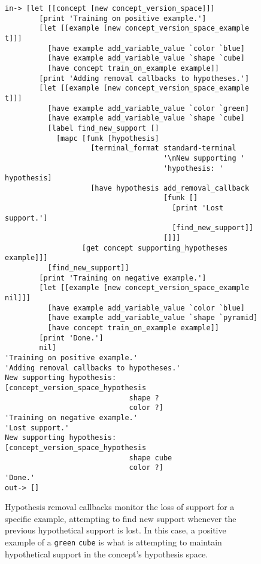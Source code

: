 \begin{figure}[h]
\centering
{\small
\begin{Verbatim}[frame=single]
 in-> [let [[concept [new concept_version_space]]]
        [print 'Training on positive example.']
        [let [[example [new concept_version_space_example t]]]
          [have example add_variable_value `color `blue]
          [have example add_variable_value `shape `cube]
          [have concept train_on_example example]]
        [print 'Adding removal callbacks to hypotheses.']
        [let [[example [new concept_version_space_example t]]]
          [have example add_variable_value `color `green]
          [have example add_variable_value `shape `cube]
          [label find_new_support []
            [mapc [funk [hypothesis]
                    [terminal_format standard-terminal
                                     '\nNew supporting '
                                     'hypothesis: ' hypothesis]
                    [have hypothesis add_removal_callback
                                     [funk []
                                       [print 'Lost support.']
                                       [find_new_support]]
                                     []]]
                  [get concept supporting_hypotheses example]]]
          [find_new_support]]
        [print 'Training on negative example.']
        [let [[example [new concept_version_space_example nil]]]
          [have example add_variable_value `color `blue]
          [have example add_variable_value `shape `pyramid]
          [have concept train_on_example example]]
        [print 'Done.']
        nil]
'Training on positive example.'
'Adding removal callbacks to hypotheses.'
New supporting hypothesis: [concept_version_space_hypothesis
                             shape ?
                             color ?]
'Training on negative example.'
'Lost support.'
New supporting hypothesis: [concept_version_space_hypothesis
                             shape cube
                             color ?]
'Done.'
out-> []
\end{Verbatim}
}
\caption[Hypothesis removal callbacks used to monitor the loss of
  support for a specific example, attempting to find new support
  whenever the previous hypothetical support is lost.]{Hypothesis
  removal callbacks monitor the loss of support for a specific
  example, attempting to find new support whenever the previous
  hypothetical support is lost.  In this case, a positive example of a
  {\tt{green}} {\tt{cube}} is what is attempting to maintain
  hypothetical support in the concept's hypothesis space.}
\label{figure:concept_version_space_hypothetical_support}
\end{figure}

